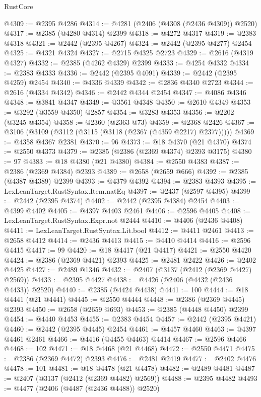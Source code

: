 \begin{lexlean}{RustCore}
\begin{coremodule}
@4309 := @2395 @4286
@4314 := @4281 (@2406 (@4308 (@2436 @4309)) @2520)
@4317 := @2385 (@4280 @4314) @2399
@4318 := @4272 @4317
@4319 := @2383 @4318
@4321 := @2442 (@2395 @4267)
@4324 := @2442 (@2395 @4277) @2454
@4325 := @4321 @4324
@4327 := @2715 @4325 @2723
@4329 := @2616 (@4319 @4327)
@4332 := @2385 (@4262 @4329) @2399
@4333 := @4254 @4332
@4334 := @2383 @4333
@4336 := @2442 (@2395 @4091)
@4339 := @2442 (@2395 @4259) @2454
@4340 := @4336 @4339
@4342 := @2836 @4340 @2723
@4344 := @2616 (@4334 @4342)
@4346 := @2442 @4344 @2454
@4347 := @4086 @4346
@4348 := @3841 @4347
@4349 := @3561 @4348
@4350 := @2610 @4349
@4353 := @3292 (@3559 @4350) @2857
@4354 := @3283 @4353
@4356 := @2202 (@3245 @4354)
@4358 := @2360 (@2363 @73)
@4359 := @2368 @2426
@4367 := @3106 (@3109 (@3112 (@3115 (@3118 (@2367 (@4359 @2217) @2377)))))
@4369 := @4358 @4367 @2381
@4370 := 96
@4373 := @18 @4370 (@21 @4370)
@4374 := @2550 @4373
@4379 := @2385 (@2386 (@2369 @4374) @2393 @3175)
@4380 := 97
@4383 := @18 @4380 (@21 @4380)
@4384 := @2550 @4383
@4387 := @2386 (@2369 @4384) @2393
@4389 := @2658 (@2659 @666)
@4392 := @2385 (@4387 @4389) @2399
@4393 := @4379 @4392
@4394 := @2383 @4393
@4395 := LexLeanTarget.RustSyntax.Item.natEq
@4397 := @2437 (@2597 @4395)
@4399 := @2442 (@2395 @4374)
@4402 := @2442 (@2395 @4384) @2454
@4403 := @4399 @4402
@4405 := @4397 @4403 @2461
@4406 := @2596 @4405
@4408 := LexLeanTarget.RustSyntax.Expr.not @2444
@4410 := @4406 (@2436 @4408)
@4411 := LexLeanTarget.RustSyntax.Lit.bool
@4412 := @4411 @2461
@4413 := @2658 @4412
@4414 := @2436 @4413
@4415 := @4410 @4414
@4416 := @2596 @4415
@4417 := 99
@4420 := @18 @4417 (@21 @4417)
@4421 := @2550 @4420
@4424 := @2386 (@2369 @4421) @2393
@4425 := @2481 @2422
@4426 := @2402 @4425
@4427 := @2489 @1346
@4432 := @2407 (@3137 (@2412 (@2369 @4427) @2569))
@4433 := @2395 @4427
@4438 := @4426 (@2406 (@4432 (@2436 @4433)) @2520)
@4440 := @2385 (@4424 @4438)
@4441 := 100
@4444 := @18 @4441 (@21 @4441)
@4445 := @2550 @4444
@4448 := @2386 (@2369 @4445) @2393
@4450 := @2658 (@2659 @693)
@4453 := @2385 (@4448 @4450) @2399
@4454 := @4440 @4453
@4455 := @2383 @4454
@4457 := @2442 (@2395 @4421)
@4460 := @2442 (@2395 @4445) @2454
@4461 := @4457 @4460
@4463 := @4397 @4461 @2461
@4466 := @4416 (@4455 @4463) @4414
@4467 := @2596 @4466
@4468 := 102
@4471 := @18 @4468 (@21 @4468)
@4472 := @2550 @4471
@4475 := @2386 (@2369 @4472) @2393
@4476 := @2481 @2419
@4477 := @2402 @4476
@4478 := 101
@4481 := @18 @4478 (@21 @4478)
@4482 := @2489 @4481
@4487 := @2407 (@3137 (@2412 (@2369 @4482) @2569))
@4488 := @2395 @4482
@4493 := @4477 (@2406 (@4487 (@2436 @4488)) @2520)

\end{coremodule}
\end{lexlean}
